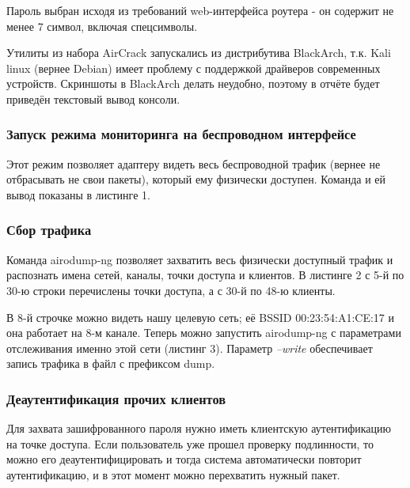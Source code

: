 \documentclass[a4paper, 12pt]{article}		%
\begin{document}
Пароль выбран исходя из требований web-интерфейса роутера - он содержит не менее 7 символ, включая спецсимволы.

Утилиты из набора AirCrack запускались из дистрибутива BlackArch, т.к. Kali linux (вернее Debian) имеет проблему с поддержкой драйверов современных устройств. Скриншоты в BlackArch делать неудобно, поэтому в отчёте будет приведён текстовый вывод консоли.

\subsubsection{Запуск режима мониторинга на беспроводном интерфейсе}

Этот режим позволяет адаптеру видеть весь беспроводной трафик (вернее не отбрасывать не свои пакеты), который ему физически доступен. Команда и ей вывод показаны в листинге 1.



\subsubsection{Сбор трафика}

Команда airodump-ng позволяет захватить весь физически доступный трафик и распознать имена сетей, каналы, точки доступа и клиентов. В листинге 2 с 5-й по 30-ю строки перечислены точки доступа, а с 30-й по 48-ю клиенты.



В 8-й строчке можно видеть нашу целевую сеть; её BSSID 00:23:54:A1:CE:17 и она работает на 8-м канале. Теперь можно запустить airodump-ng с параметрами отслеживания именно этой сети (листинг 3). Параметр \textit{--write} обеспечивает запись трафика в файл с префиксом dump.



\subsubsection{Деаутентификация прочих клиентов}

Для захвата зашифрованного пароля нужно иметь клиентскую аутентификацию на точке доступа. Если пользователь уже прошел проверку подлинности, то можно его деаутентифицировать и тогда система автоматически повторит аутентификацию, и в этот момент можно перехватить нужный пакет.
\end{document}

